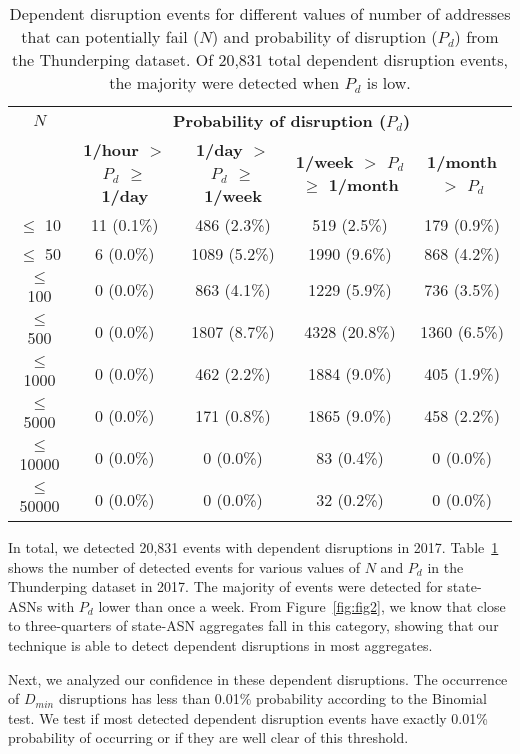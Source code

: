 \begin{table}[th]
  \centering
  \hspace{-0.04in}\tiny
  \begin{tabular}{c|c|c|c|c|}
\textbf{$N$} & \multicolumn{4}{c|}{\textbf{Probability of disruption ($P_d$)}} \\
    & \textbf{ 1/hour $>$ $P_d$ $\geq$ 1/day} & \textbf{1/day $>$
      $P_d$ $\geq$ 1/week} & \textbf{1/week $>$ $P_d$ $\geq$ 1/month} &
    \textbf{1/month $>$ $P_d$} \\
    \hline
$\leq$ 10 & 11 (0.1\%) & 486 (2.3\%) & 519 (2.5\%) & 179 (0.9\%) \\
$\leq$ 50 & 6 (0.0\%) & 1089 (5.2\%) & 1990 (9.6\%) & 868 (4.2\%) \\
$\leq$ 100 & 0 (0.0\%) & 863 (4.1\%) & 1229 (5.9\%) & 736 (3.5\%) \\
$\leq$ 500 & 0 (0.0\%) & 1807 (8.7\%) & 4328 (20.8\%) & 1360 (6.5\%) \\
$\leq$ 1000 & 0 (0.0\%) & 462 (2.2\%) & 1884 (9.0\%) & 405 (1.9\%) \\
$\leq$ 5000 & 0 (0.0\%) & 171 (0.8\%) & 1865 (9.0\%) & 458 (2.2\%) \\
$\leq$ 10000 & 0 (0.0\%) & 0 (0.0\%) & 83 (0.4\%) & 0 (0.0\%) \\
$\leq$ 50000 & 0 (0.0\%) & 0 (0.0\%) & 32 (0.2\%) & 0 (0.0\%) \\
    \end{tabular}
  \caption{\label{tbl:events_per_nup_and_fprob} Dependent disruption
events for different values of number of addresses that can
potentially fail ($N$) and probability of disruption ($P_d$) from the
Thunderping dataset. Of 20,831 total dependent disruption
events, the majority were detected when $P_d$ is low.
  }
\end{table}

In total, we detected 20,831 events with dependent disruptions in
2017. Table~\ref{tbl:events_per_nup_and_fprob} shows the number of
detected events for various values of $N$ and $P_d$ in the Thunderping dataset
in 2017. The majority of events were detected for state-ASNs with
$P_d$ lower than once a week. From Figure~\ref{fig:fig2}, we know that
close to three-quarters of state-ASN aggregates fall in this
category, showing that our technique is able to detect dependent
disruptions in most aggregates.

Next, we analyzed our confidence in these dependent
disruptions. The occurrence of $D_{min}$ disruptions has less than 0.01\%
probability according to the Binomial test. We test if most detected
dependent disruption events have exactly 0.01\%
probability of occurring or if they are well clear of this threshold.

